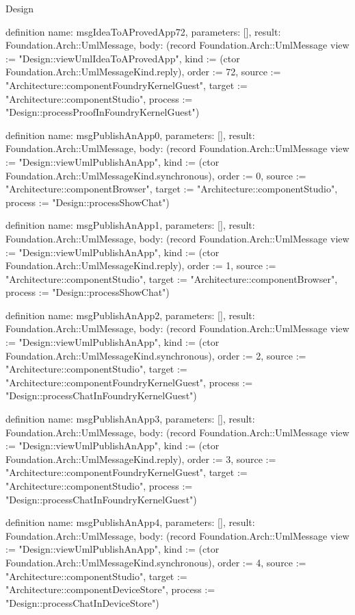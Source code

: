 \begin{lexlean}{Design}
\begin{semanticmodule}
definition{
  name: msgIdeaToAProvedApp72,
  parameters: [],
  result: Foundation.Arch::UmlMessage,
  body: (record Foundation.Arch::UmlMessage {view := "Design::viewUmlIdeaToAProvedApp", kind := (ctor Foundation.Arch::UmlMessageKind.reply), order := 72, source := "Architecture::componentFoundryKernelGuest", target := "Architecture::componentStudio", process := "Design::processProofInFoundryKernelGuest"})
}

definition{
  name: msgPublishAnApp0,
  parameters: [],
  result: Foundation.Arch::UmlMessage,
  body: (record Foundation.Arch::UmlMessage {view := "Design::viewUmlPublishAnApp", kind := (ctor Foundation.Arch::UmlMessageKind.synchronous), order := 0, source := "Architecture::componentBrowser", target := "Architecture::componentStudio", process := "Design::processShowChat"})
}

definition{
  name: msgPublishAnApp1,
  parameters: [],
  result: Foundation.Arch::UmlMessage,
  body: (record Foundation.Arch::UmlMessage {view := "Design::viewUmlPublishAnApp", kind := (ctor Foundation.Arch::UmlMessageKind.reply), order := 1, source := "Architecture::componentStudio", target := "Architecture::componentBrowser", process := "Design::processShowChat"})
}

definition{
  name: msgPublishAnApp2,
  parameters: [],
  result: Foundation.Arch::UmlMessage,
  body: (record Foundation.Arch::UmlMessage {view := "Design::viewUmlPublishAnApp", kind := (ctor Foundation.Arch::UmlMessageKind.synchronous), order := 2, source := "Architecture::componentStudio", target := "Architecture::componentFoundryKernelGuest", process := "Design::processChatInFoundryKernelGuest"})
}

definition{
  name: msgPublishAnApp3,
  parameters: [],
  result: Foundation.Arch::UmlMessage,
  body: (record Foundation.Arch::UmlMessage {view := "Design::viewUmlPublishAnApp", kind := (ctor Foundation.Arch::UmlMessageKind.reply), order := 3, source := "Architecture::componentFoundryKernelGuest", target := "Architecture::componentStudio", process := "Design::processChatInFoundryKernelGuest"})
}

definition{
  name: msgPublishAnApp4,
  parameters: [],
  result: Foundation.Arch::UmlMessage,
  body: (record Foundation.Arch::UmlMessage {view := "Design::viewUmlPublishAnApp", kind := (ctor Foundation.Arch::UmlMessageKind.synchronous), order := 4, source := "Architecture::componentStudio", target := "Architecture::componentDeviceStore", process := "Design::processChatInDeviceStore"})
}


\end{semanticmodule}
\end{lexlean}
